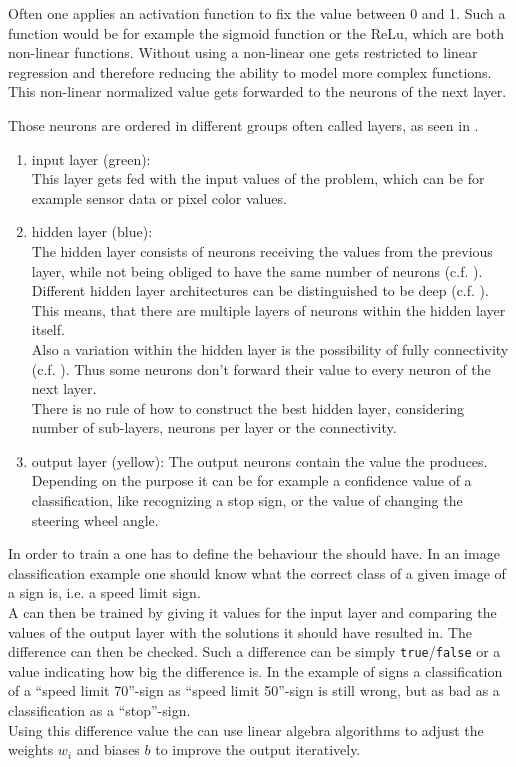 Often one applies an activation function to fix the value between 0 and 1. Such a function would be for example the sigmoid function or the ReLu, which are both non-linear functions. Without using a non-linear one gets restricted to linear regression and therefore reducing the ability to model more complex functions.
This non-linear normalized value gets forwarded to the neurons of the next layer.

Those neurons are ordered in different groups often called layers, as seen in .
\begin{enumerate}
	\item input layer (green):\\ \label{item input layer}
	This layer gets fed with the input values of the problem, which can be for example sensor data or pixel color values.
	\item hidden layer (blue):\\\label{item hidden layer}
	The hidden layer consists of neurons receiving the values from the previous layer, while not being obliged to have the same number of neurons (c.f. ).
	Different hidden layer architectures can be distinguished to be deep (c.f. ). This means, that there are multiple layers of neurons within the hidden layer itself.\\
	Also a variation within the hidden layer is the possibility of fully connectivity (c.f. ). Thus some neurons don't forward their value to every neuron of the next layer.\\
	There is no rule of how to construct the best hidden layer, considering number of sub-layers, neurons per layer or the connectivity.
	\item output layer (yellow):\label{item output layer}
	The output neurons contain the value the \nn produces. Depending on the \nns purpose it can be for example a confidence value of a classification, like recognizing a stop sign, or the value of changing the steering wheel angle. 
\end{enumerate}

In order to train a \nn one has to define the behaviour the \nn should have. In an image classification example one should know what the correct class of a given image of a sign is, i.e. a speed limit sign.\\
A \nn can then be trained by giving it values for the input layer and comparing the values of the output layer with the solutions it should have resulted in. The difference can then be checked. Such a difference can be simply \texttt{true}/\texttt{false} or a value indicating how big the difference is. In the example of signs a classification of a ``speed limit 70''-sign as ``speed limit 50''-sign is still wrong, but as bad as a classification as a ``stop''-sign.\\
Using this difference value the \nn can use linear algebra algorithms to adjust the weights $w_i$ and biases $b$ to improve the output iteratively.

